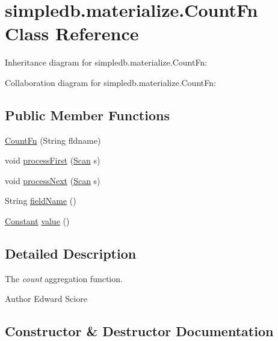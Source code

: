 \hypertarget{classsimpledb_1_1materialize_1_1CountFn}{}\section{simpledb.\+materialize.\+Count\+Fn Class Reference}
\label{classsimpledb_1_1materialize_1_1CountFn}


Inheritance diagram for simpledb.\+materialize.\+Count\+Fn\+:


Collaboration diagram for simpledb.\+materialize.\+Count\+Fn\+:
\subsection*{Public Member Functions}
\begin{DoxyCompactItemize}
\item 
\hyperlink{classsimpledb_1_1materialize_1_1CountFn_a0b09ab4463c263133a043050ada1ae16}{Count\+Fn} (String fldname)
\item 
void \hyperlink{classsimpledb_1_1materialize_1_1CountFn_ad2de83ee6906e5407cad7e8f2b2c9e42}{process\+First} (\hyperlink{interfacesimpledb_1_1query_1_1Scan}{Scan} s)
\item 
void \hyperlink{classsimpledb_1_1materialize_1_1CountFn_ac50cdba40eda7611ff8e015d8c305197}{process\+Next} (\hyperlink{interfacesimpledb_1_1query_1_1Scan}{Scan} s)
\item 
String \hyperlink{classsimpledb_1_1materialize_1_1CountFn_a283e9fa1325fd5f81821ef3d3fdcec27}{field\+Name} ()
\item 
\hyperlink{classsimpledb_1_1query_1_1Constant}{Constant} \hyperlink{classsimpledb_1_1materialize_1_1CountFn_aba7aff6e83f0f0af171edb64be6cb342}{value} ()
\end{DoxyCompactItemize}


\subsection{Detailed Description}
The {\itshape count} aggregation function. \begin{DoxyAuthor}{Author}
Edward Sciore 
\end{DoxyAuthor}


\subsection{Constructor \& Destructor Documentation}
\mbox{\label{classsimpledb_1_1materialize_1_1CountFn_a0b09ab4463c263133a043050ada1ae16}} 
